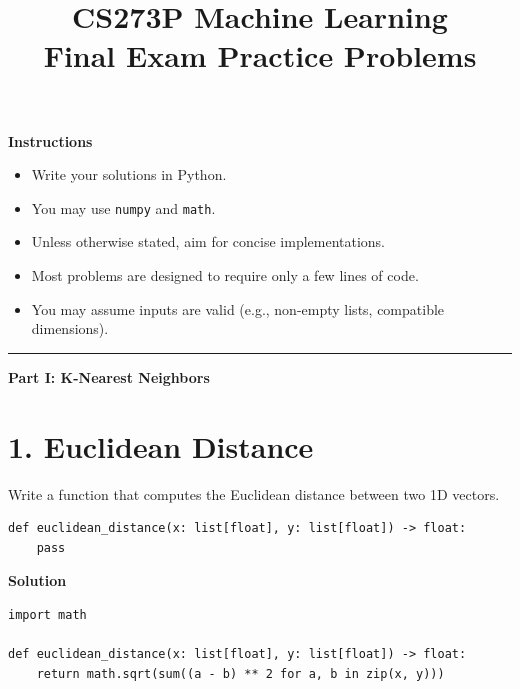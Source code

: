 \documentclass[11pt]{article}
\title{CS273P Machine Learning\\Final Exam Practice Problems}
\date{}
\author{}
\begin{document}
\maketitle

\begin{center}
\end{center}

\vspace{1em}

\noindent\textbf{Instructions}
\begin{itemize}[leftmargin=1.5em]
    \item Write your solutions in Python.
    \item You may use \texttt{numpy} and \texttt{math}.
    \item Unless otherwise stated, aim for concise implementations.
    \item Most problems are designed to require only a few lines of code.
    \item You may assume inputs are valid (e.g., non-empty lists, compatible dimensions).
\end{itemize}

\vspace{1.5em}
\hrule
\vspace{1em}

\noindent\textbf{\large Part I: K-Nearest Neighbors}
\vspace{0.5em}

\section*{1. Euclidean Distance}
Write a function that computes the Euclidean distance between two 1D vectors.

\begin{lstlisting}
def euclidean_distance(x: list[float], y: list[float]) -> float:
    pass
\end{lstlisting}

\medskip
\noindent\textbf{Solution}
\begin{lstlisting}
import math

def euclidean_distance(x: list[float], y: list[float]) -> float:
    return math.sqrt(sum((a - b) ** 2 for a, b in zip(x, y)))
\end{lstlisting}
\end{document}
